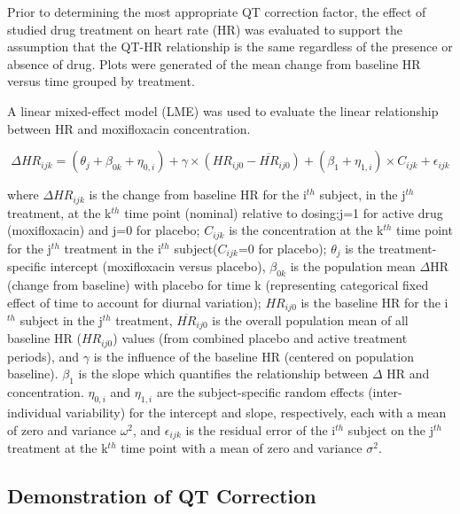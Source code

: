 \documentclass[
]{article}
\begin{document}
Prior to determining the most appropriate QT correction factor, the
effect of studied drug treatment on heart rate (HR) was evaluated to
support the assumption that the QT-HR relationship is the same
regardless of the presence or absence of drug. Plots were generated of
the mean change from baseline HR versus time grouped by treatment.

A linear mixed-effect model (LME) was used to evaluate the linear
relationship between HR and moxifloxacin concentration.

\begin{equation} \label{HReq}
\Delta HR_{ijk}=(\theta_j + \beta_{0k} + \eta_{0,i})+\gamma \times(HR_{ij0}-\overline{HR}_{ij0})+(\beta_1 +\eta_{1,i}) \times C_{ijk} +\epsilon_{ijk}
\end{equation}

where \(\Delta HR_{ijk}\) is the change from baseline HR for the
i\(^{th}\) subject, in the j\(^{th}\) treatment, at the k\(^{th}\) time
point (nominal) relative to dosing;j=1 for active drug (moxifloxacin)
and j=0 for placebo; \(C_{ijk}\) is the concentration at the k\(^{th}\)
time point for the j\(^{th}\) treatment in the i\(^{th}\)
subject(\(C_{ijk}\)=0 for placebo); \(\theta_j\) is the
treatment-specific intercept (moxifloxacin versus placebo),
\(\beta_{0k}\) is the population mean \(\Delta\)HR (change from
baseline) with placebo for time k (representing categorical fixed effect
of time to account for diurnal variation); \(HR_{ij0}\) is the baseline
HR for the i\(^{th}\) subject in the j\(^{th}\) treatment,
\(\overline{HR}_{ij0}\) is the overall population mean of all baseline
HR (\(HR_{ij0}\)) values (from combined placebo and active treatment
periods), and \(\gamma\) is the influence of the baseline HR (centered
on population baseline). \(\beta_1\) is the slope which quantifies the
relationship between \(\Delta\) HR and concentration. \(\eta_{0,i}\) and
\(\eta_{1,i}\) are the subject-specific random effects (inter-individual
variability) for the intercept and slope, respectively, each with a mean
of zero and variance \(\omega^2\), and \(\epsilon_{ijk}\) is the
residual error of the i\(^{th}\) subject on the j\(^{th}\) treatment at
the k\(^{th}\) time point with a mean of zero and variance \(\sigma^2\).

\hypertarget{demonstration-of-qt-correction}{%
\subsection{Demonstration of QT
Correction}\label{demonstration-of-qt-correction}}
\end{document}

